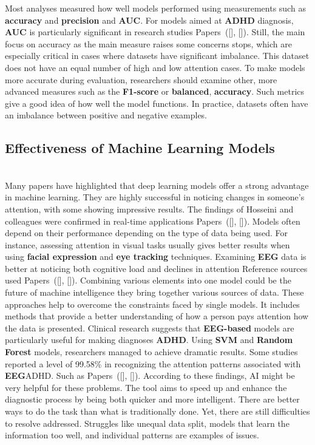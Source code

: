 \documentclass[twocolumn,12pt]{article}
\begin{document}
{Most analyses measured how well models performed using measurements such as \textbf{accuracy} and \textbf{precision} and \textbf{AUC}. For models aimed at \textbf{ADHD} diagnosis, \textbf{AUC} is particularly significant in research studies Papers~([\citealp{ref11}], [\citealp{ref19}]). Still, the main focus on accuracy as the main measure raises some concerns stops, which are especially critical in cases where datasets have significant imbalance.
This dataset does not have an equal number of high and low attention cases. To make models more accurate during evaluation, researchers should examine other, more advanced measures such as the \textbf{F1-score} or \textbf{balanced}, \textbf{accuracy}. Such metrics give a good idea of how well the model functions.
In practice, datasets often have an imbalance between positive and negative examples.

\subsection{ Effectiveness of Machine Learning Models} \\

Many papers have highlighted that deep learning models offer a strong advantage in machine learning. They are highly successful in noticing changes in someone’s attention, with some showing impressive results. The findings of Hosseini and colleagues were confirmed in real-time applications Papers~([\citealp{ref1}], [\citealp{ref8}]). Models often depend on their performance depending on the type of data being used. For instance, assessing attention in visual tasks usually gives better results when using \textbf{facial expression} and \textbf{eye tracking} techniques. Examining \textbf{EEG} data is better at noticing both cognitive load and declines in attention Reference sources used Papers~([\citealp{ref3}], [\citealp{ref16}]). Combining various elements into one model could be the future of machine intelligence they bring together various sources of data. These approaches help to overcome the constraints faced by single models. It includes methods that provide a better understanding of how a person pays attention how the data is presented. Clinical research suggests that \textbf{EEG-based} models are particularly useful for making diagnoses \textbf{ADHD}. Using \textbf{SVM} and \textbf{Random Forest} models, researchers managed to achieve dramatic results. Some studies reported a level of 99.58\% in recognizing the attention patterns associated with \textbf{EEG}ADHD. Such as Papers~([\citealp{ref11}], [\citealp{ref19}]). According to these findings, AI might be very helpful for these problems. The tool aims to speed up and enhance the diagnostic process by being both quicker and more intelligent. There are better ways to do the task than what is traditionally done. Yet, there are still difficulties to resolve addressed. Struggles like unequal data split, models that learn the information too well, and individual patterns are examples of issues.

}
\end{document}
